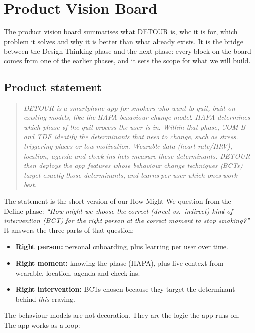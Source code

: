 \section{Product Vision Board}
\label{sec:vision-board}

The product vision board summarises what DETOUR is, who it is for, which problem it solves and why it is better than what already exists. It is the bridge between the Design Thinking phase and the next phase: every block on the board comes from one of the earlier phases, and it sets the scope for what we will build.

\subsection{Product statement}
\label{subsec:product-statement}

\begin{quote}
\textit{DETOUR is a smartphone app for smokers who want to quit, built on existing models, like the HAPA behaviour change model. HAPA determines which phase of the quit process the user is in. Within that phase, COM-B and TDF identify the determinants that need to change, such as stress, triggering places or low motivation. Wearable data (heart rate/HRV), location, agenda and check-ins help measure these determinants. DETOUR then deploys the app features whose behaviour change techniques (BCTs) target exactly those determinants, and learns per user which ones work best.}
\end{quote}

The statement is the short version of our How Might We question from the Define phase: \textit{``How might we choose the correct (direct vs.\ indirect) kind of intervention (BCT) for the right person at the correct moment to stop smoking?''} It answers the three parts of that question:

\begin{itemize}
    \item \textbf{Right person:} personal onboarding, plus learning per user over time.
    \item \textbf{Right moment:} knowing the phase (HAPA), plus live context from wearable, location, agenda and check-ins.
    \item \textbf{Right intervention:} BCTs chosen because they target the determinant behind \textit{this} craving.
\end{itemize}

The behaviour models are not decoration. They are the logic the app runs on. The app works as a loop:

